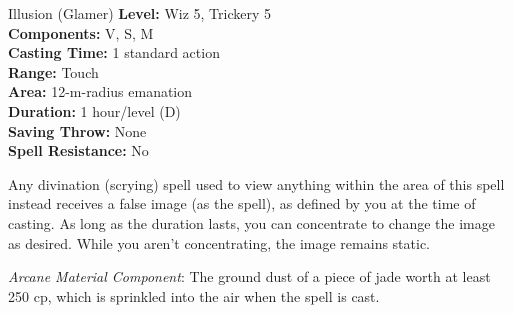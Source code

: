 {Illusion (Glamer)}
{
	\textbf{Level:}
	Wiz 5, Trickery 5\\
	\textbf{Components:}
	V, S, M\\
	\textbf{Casting Time:}
	1 standard action\\
	\textbf{Range:}
	Touch\\
	\textbf{Area:}
	12-m-radius emanation\\
	\textbf{Duration:}
	1 hour/level (D)\\
	\textbf{Saving Throw:}
	None\\
	\textbf{Spell Resistance:}
	No\\
}
{
	Any divination (scrying) spell used to view anything within the area of this spell instead receives a false image (as the  spell), as defined by you at the time of casting. As long as the duration lasts, you can concentrate to change the image as desired. While you aren't concentrating, the image remains static.

	\textit{Arcane Material Component}:
	The ground dust of a piece of jade worth at least 250 cp, which is sprinkled into the air when the spell is cast.

}
